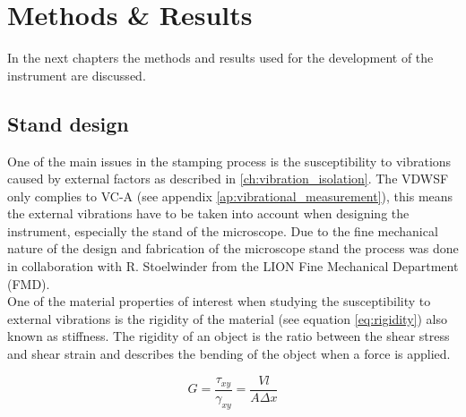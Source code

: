 \documentclass[10pt]{article}
\begin{document}


\section{Methods \& Results}
In the next chapters the methods and results used for the development of the instrument are discussed.



\subsection{Stand design}
One of the main issues in the stamping process is the susceptibility to vibrations caused by external factors as described in \ref{ch:vibration_isolation}.
The VDWSF only complies to VC-A (see appendix \ref{ap:vibrational_measurement}), this means the external vibrations have to be taken into account when designing the instrument, especially the stand of the microscope. 
Due to the fine mechanical nature of the design and fabrication of the microscope stand the process was done in collaboration with R. Stoelwinder from the LION Fine Mechanical Department (FMD).\\

One of the material properties of interest when studying the susceptibility to external vibrations is the rigidity of the material (see equation \ref{eq:rigidity}) also known as stiffness. 
The rigidity of an object is the ratio between the shear stress and shear strain and describes the bending of the object when a force is applied.


\begin{equation}
    G = \frac{\tau_{xy}}{\gamma_{xy}} = \frac{Vl}{A\Delta{x}}
    \label{eq:rigidity}
\end{equation}
\end{document}
